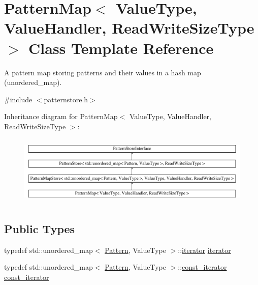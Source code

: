 \hypertarget{classPatternMap}{}\section{Pattern\+Map$<$ Value\+Type, Value\+Handler, Read\+Write\+Size\+Type $>$ Class Template Reference}
\label{classPatternMap}


A pattern map storing patterns and their values in a hash map (unordered\+\_\+map).  




{\ttfamily \#include $<$patternstore.\+h$>$}

Inheritance diagram for Pattern\+Map$<$ Value\+Type, Value\+Handler, Read\+Write\+Size\+Type $>$\+:\begin{figure}[H]
\begin{center}
\leavevmode
\includegraphics[height=3.393939cm]{classPatternMap}
\end{center}
\end{figure}
\subsection*{Public Types}
\begin{DoxyCompactItemize}
\item 
typedef std\+::unordered\+\_\+map$<$ \hyperlink{classPattern}{Pattern}, Value\+Type $>$\+::\hyperlink{classPatternMap_a4de5ceaff3526d091098b4d82dde2b27}{iterator} \hyperlink{classPatternMap_a4de5ceaff3526d091098b4d82dde2b27}{iterator}
\item 
typedef std\+::unordered\+\_\+map$<$ \hyperlink{classPattern}{Pattern}, Value\+Type $>$\+::\hyperlink{classPatternMap_aba8ff62eadadedc25bf4ea799a322cf3}{const\+\_\+iterator} \hyperlink{classPatternMap_aba8ff62eadadedc25bf4ea799a322cf3}{const\+\_\+iterator}
\end{DoxyCompactItemize}
